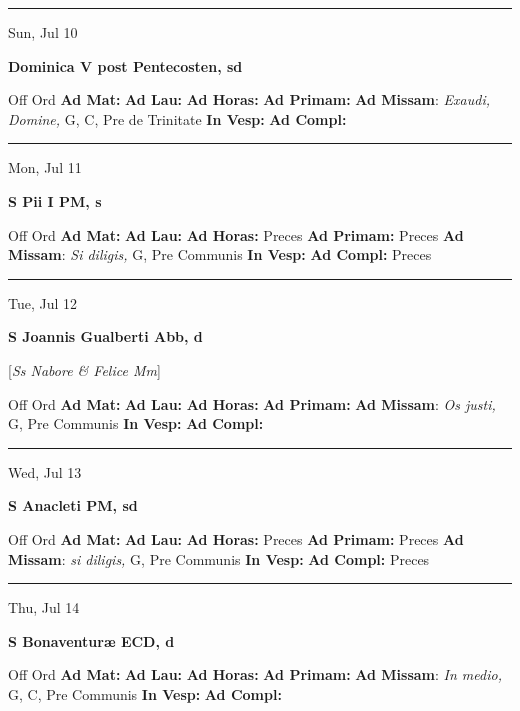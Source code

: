\documentclass[letterpaper, 10pt]{article}
\begin{document}
\hrule
\begin{center}
Sun, Jul 10
\end{center}\textbf{ \large Dominica V post Pentecosten, \textnormal{\normalsize sd}}
\begin{justify}
Off Ord
\textbf{Ad Mat: }
\textbf{Ad Lau: }
\textbf{Ad Horas: }
\textbf{Ad Primam: }
\textbf{Ad Missam}: \textit{Exaudi, Domine,} G, C, Pre de Trinitate
\textbf{In Vesp: }
\textbf{Ad Compl: }\end{justify}



\hrule
\begin{center}
Mon, Jul 11
\end{center}\textbf{ \large S Pii I PM, \textnormal{\normalsize s}}
\begin{justify}
Off Ord
\textbf{Ad Mat: }
\textbf{Ad Lau: }
\textbf{Ad Horas: }Preces
\textbf{Ad Primam: }Preces
\textbf{Ad Missam}: \textit{Si diligis,} G, Pre Communis
\textbf{In Vesp: }
\textbf{Ad Compl: }Preces\end{justify}



\hrule
\begin{center}
Tue, Jul 12
\end{center}\textbf{ \large S Joannis Gualberti Abb, \textnormal{\normalsize d}}

[\textit{Ss Nabore \& Felice Mm}]
\begin{justify}
Off Ord
\textbf{Ad Mat: }
\textbf{Ad Lau: }
\textbf{Ad Horas: }
\textbf{Ad Primam: }
\textbf{Ad Missam}: \textit{Os justi,} G, Pre Communis
\textbf{In Vesp: }
\textbf{Ad Compl: }\end{justify}



\hrule
\begin{center}
Wed, Jul 13
\end{center}\textbf{ \large S Anacleti PM, \textnormal{\normalsize sd}}
\begin{justify}
Off Ord
\textbf{Ad Mat: }
\textbf{Ad Lau: }
\textbf{Ad Horas: }Preces
\textbf{Ad Primam: }Preces
\textbf{Ad Missam}: \textit{si diligis,} G, Pre Communis
\textbf{In Vesp: }
\textbf{Ad Compl: }Preces\end{justify}



\hrule
\begin{center}
Thu, Jul 14
\end{center}\textbf{ \large S Bonaventuræ ECD, \textnormal{\normalsize d}}
\begin{justify}
Off Ord
\textbf{Ad Mat: }
\textbf{Ad Lau: }
\textbf{Ad Horas: }
\textbf{Ad Primam: }
\textbf{Ad Missam}: \textit{In medio,} G, C, Pre Communis
\textbf{In Vesp: }
\textbf{Ad Compl: }\end{justify}
\end{document}
